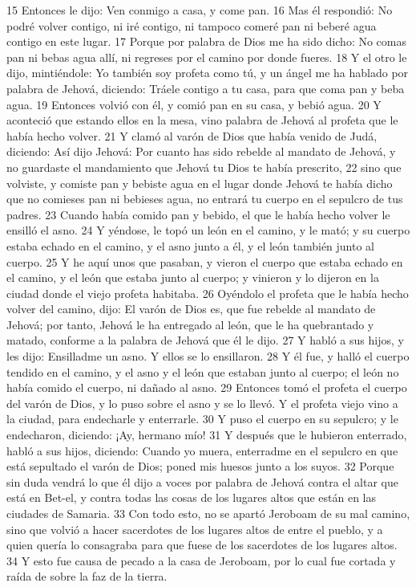 15 Entonces le dijo: Ven conmigo a casa, y come pan.
16 Mas él respondió: No podré volver contigo, ni iré contigo, ni tampoco comeré pan ni beberé agua contigo en este lugar.
17 Porque por palabra de Dios me ha sido dicho: No comas pan ni bebas agua allí, ni regreses por el camino por donde fueres.
18 Y el otro le dijo, mintiéndole: Yo también soy profeta como tú, y un ángel me ha hablado por palabra de Jehová, diciendo: Tráele contigo a tu casa, para que coma pan y beba agua.
19 Entonces volvió con él, y comió pan en su casa, y bebió agua.
20 Y aconteció que estando ellos en la mesa, vino palabra de Jehová al profeta que le había hecho volver.
21 Y clamó al varón de Dios que había venido de Judá, diciendo: Así dijo Jehová: Por cuanto has sido rebelde al mandato de Jehová, y no guardaste el mandamiento que Jehová tu Dios te había prescrito,
22 sino que volviste, y comiste pan y bebiste agua en el lugar donde Jehová te había dicho que no comieses pan ni bebieses agua, no entrará tu cuerpo en el sepulcro de tus padres.
23 Cuando había comido pan y bebido, el que le había hecho volver le ensilló el asno.
24 Y yéndose, le topó un león en el camino, y le mató; y su cuerpo estaba echado en el camino, y el asno junto a él, y el león también junto al cuerpo.
25 Y he aquí unos que pasaban, y vieron el cuerpo que estaba echado en el camino, y el león que estaba junto al cuerpo; y vinieron y lo dijeron en la ciudad donde el viejo profeta habitaba.
26 Oyéndolo el profeta que le había hecho volver del camino, dijo: El varón de Dios es, que fue rebelde al mandato de Jehová; por tanto, Jehová le ha entregado al león, que le ha quebrantado y matado, conforme a la palabra de Jehová que él le dijo.
27 Y habló a sus hijos, y les dijo: Ensilladme un asno. Y ellos se lo ensillaron.
28 Y él fue, y halló el cuerpo tendido en el camino, y el asno y el león que estaban junto al cuerpo; el león no había comido el cuerpo, ni dañado al asno.
29 Entonces tomó el profeta el cuerpo del varón de Dios, y lo puso sobre el asno y se lo llevó. Y el profeta viejo vino a la ciudad, para endecharle y enterrarle.
30 Y puso el cuerpo en su sepulcro; y le endecharon, diciendo: ¡Ay, hermano mío!
31 Y después que le hubieron enterrado, habló a sus hijos, diciendo: Cuando yo muera, enterradme en el sepulcro en que está sepultado el varón de Dios; poned mis huesos junto a los suyos.
32 Porque sin duda vendrá lo que él dijo a voces por palabra de Jehová contra el altar que está en Bet-el, y contra todas las cosas de los lugares altos que están en las ciudades de Samaria.
33 Con todo esto, no se apartó Jeroboam de su mal camino, sino que volvió a hacer sacerdotes de los lugares altos de entre el pueblo, y a quien quería lo consagraba para que fuese de los sacerdotes de los lugares altos.
34 Y esto fue causa de pecado a la casa de Jeroboam, por lo cual fue cortada y raída de sobre la faz de la tierra.

